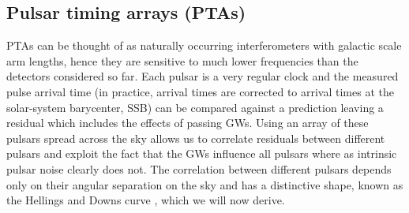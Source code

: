 \subsection{Pulsar timing arrays (PTAs)}\label{sec:PTAgeneralproperties}
PTAs can be thought of as naturally occurring interferometers with galactic scale arm lengths, hence they are sensitive to much lower frequencies than the detectors considered so far. Each pulsar is a very regular clock and the measured pulse arrival time (in practice, arrival times are corrected to arrival times at the solar-system  barycenter, SSB) can be compared against a prediction leaving a residual which includes the effects of passing GWs. Using an array of these pulsars spread across the sky allows us to correlate residuals between different pulsars and exploit the fact that the GWs influence all pulsars where as intrinsic pulsar noise clearly does not. The correlation between different pulsars depends only on their angular separation on the sky and has a distinctive shape, known as the Hellings and Downs curve \citep{HellingsDowns}, which we will now derive.

